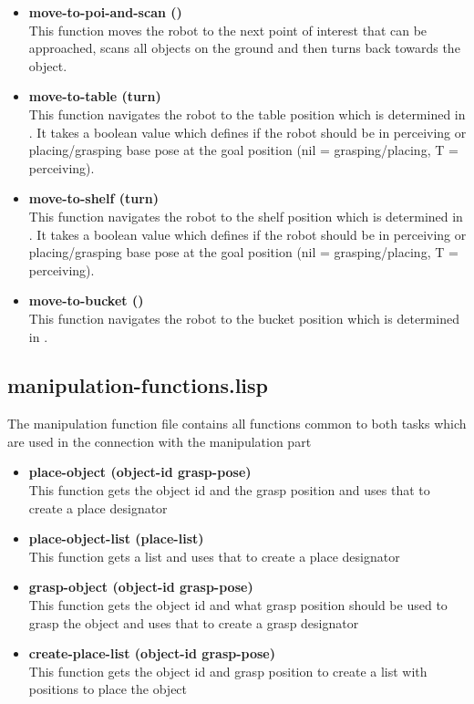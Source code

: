 \documentclass[main.tex]{subfiles}
\begin{document}
\begin{itemize}
	    \item \textbf{move-to-poi-and-scan ()} \\
	    This function moves the robot to the next point of interest that can be approached, scans all objects on the ground and then turns back towards the object.
	    \item \textbf{move-to-table (turn)} \\
	    This function navigates the robot to the table position which is determined in . It takes a boolean value which defines if the robot should be in perceiving or placing/grasping base pose at the goal position (nil = grasping/placing, T = perceiving). 
	    \item \textbf{move-to-shelf (turn)} \\
	    This function navigates the robot to the shelf position which is determined in . It takes a boolean value which defines if the robot should be in perceiving or placing/grasping base pose at the goal position (nil = grasping/placing, T = perceiving).
	    \item \textbf{move-to-bucket ()} \\
	    This function navigates the robot to the bucket position which is determined in .  
		\end{itemize}
	    \subsection{manipulation-functions.lisp}
	    \label{manipulation}
	    The manipulation function file contains all functions common to both tasks which are used in the connection with the manipulation part
	    \begin{itemize}
	    \item \textbf{place-object (object-id grasp-pose)} \\
	    This function gets the object id and the grasp position and uses that to create a place designator  
		\item \textbf{place-object-list (place-list)} \\
		This function gets a list and uses that to create a place designator 
	    \item \textbf{grasp-object (object-id grasp-pose)} \\
	    This function gets the object id and what grasp position should be used to grasp the object and uses that to create a grasp designator
	    \item \textbf{create-place-list (object-id grasp-pose)} \\
	    This function gets the object id and grasp position to create a list with positions to place the object
		\end{itemize}
\end{document}
